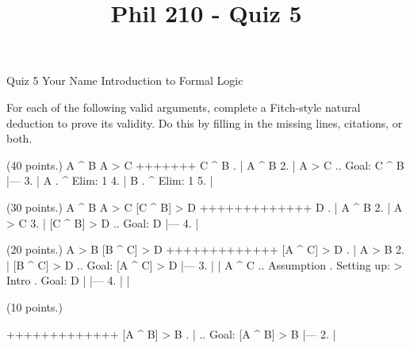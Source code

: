 
\title{Phil 210 - Quiz 5}

\heading
Quiz 5
Your Name
Introduction to Formal Logic
\endheading

For each of the following valid arguments, complete a Fitch-style natural deduction to prove its validity. Do this by filling in the missing lines, citations, or both.

\problems
{} (40 points.)
\argument
 A ^ B
 A > C
+++++++
 C ^ B
\endargument
        \answer
        . | A ^ B
         2. | A > C  ..  Goal: C ^ B
            |---
         3. | A      .  ^ Elim: 1
         4. | B      .  ^ Elim: 1
         5. | 
        \endfitchproof
        \endanswer

 (30 points.)
\argument
 A ^ B
 A > C
 [C ^ B] > D
+++++++++++++
 D
\endargument
        \answer
        . | A ^ B
         2. | A > C
         3. | [C ^ B] > D  ..  Goal: D
            |---
         4. | 
        \endfitchproof
        \endanswer

 (20 points.)
\argument
 A > B
 [B ^ C] > D
+++++++++++++
 [A ^ C] > D
\endargument
        \answer
        . | A > B
         2. | [B ^ C] > D  ..  Goal: [A ^ C] > D
            |---
         3. |   | A ^ C    ..  Assumption  .  Setting up: > Intro  .  Goal: D
            |   |---
         4. |   | 
        \endfitchproof
        \endanswer

 (10 points.)
\argument

+++++++++++++
 [A ^ B] > B
\endargument
        \answer
        . |              ..  Goal: [A ^ B] > B
            |---
         2. | 
        \endfitchproof
        \endanswer

\endproblems
\bye
